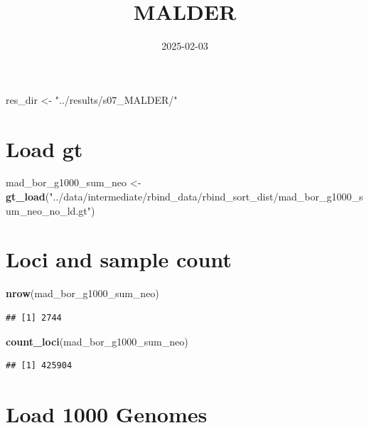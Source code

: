 \documentclass[
]{article}
\title{MALDER}
\author{}
\date{\vspace{-2.5em}2025-02-03}
\newenvironment{Shaded}{\begin{snugshade}}{\end{snugshade}}
\newcommand{\FunctionTok}[1]{\textcolor[rgb]{0.13,0.29,0.53}{\textbf{#1}}}
\newcommand{\NormalTok}[1]{#1}
\newcommand{\OtherTok}[1]{\textcolor[rgb]{0.56,0.35,0.01}{#1}}
\newcommand{\StringTok}[1]{\textcolor[rgb]{0.31,0.60,0.02}{#1}}
\begin{document}
\maketitle

\begin{Shaded}
\begin{Highlighting}[]
\NormalTok{res\_dir }\OtherTok{\textless{}{-}} \StringTok{"../results/s07\_MALDER/"}
\end{Highlighting}
\end{Shaded}

\section{Load gt}\label{load-gt}

\begin{Shaded}
\begin{Highlighting}[]
\NormalTok{mad\_bor\_g1000\_sum\_neo }\OtherTok{\textless{}{-}}
  \FunctionTok{gt\_load}\NormalTok{(}\StringTok{"../data/intermediate/rbind\_data/rbind\_sort\_dist/mad\_bor\_g1000\_sum\_neo\_no\_ld.gt"}\NormalTok{)}
\end{Highlighting}
\end{Shaded}

\section{Loci and sample count}\label{loci-and-sample-count}

\begin{Shaded}
\begin{Highlighting}[]
\FunctionTok{nrow}\NormalTok{(mad\_bor\_g1000\_sum\_neo)}
\end{Highlighting}
\end{Shaded}

\begin{verbatim}
## [1] 2744
\end{verbatim}

\begin{Shaded}
\begin{Highlighting}[]
\FunctionTok{count\_loci}\NormalTok{(mad\_bor\_g1000\_sum\_neo)}
\end{Highlighting}
\end{Shaded}

\begin{verbatim}
## [1] 425904
\end{verbatim}

\section{Load 1000 Genomes}\label{load-1000-genomes}
\end{document}
